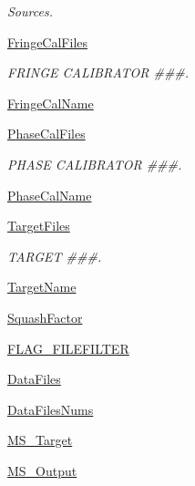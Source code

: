 \begin{DoxyCompactItemize}
\begin{DoxyCompactList}\small\item\em \-Sources. \end{DoxyCompactList}\item 
\hyperlink{class_pipeline_1_1_pipeline_ab6b367f5554299d96da7e775e33ec452}{\-Fringe\-Cal\-Files}
\begin{DoxyCompactList}\small\item\em \-F\-R\-I\-N\-G\-E \-C\-A\-L\-I\-B\-R\-A\-T\-O\-R \#\#\#. \end{DoxyCompactList}\item 
\hyperlink{class_pipeline_1_1_pipeline_a4b0ac4270d57356f5c98400997decec4}{\-Fringe\-Cal\-Name}
\item 
\hyperlink{class_pipeline_1_1_pipeline_a714f0bdb50292682a0feeeebb43f66c7}{\-Phase\-Cal\-Files}
\begin{DoxyCompactList}\small\item\em \-P\-H\-A\-S\-E \-C\-A\-L\-I\-B\-R\-A\-T\-O\-R \#\#\#. \end{DoxyCompactList}\item 
\hyperlink{class_pipeline_1_1_pipeline_abe7d2b03c9499e095c32696eb4407f97}{\-Phase\-Cal\-Name}
\item 
\hyperlink{class_pipeline_1_1_pipeline_a0be4f05b9f36d968de11c252c16d839b}{\-Target\-Files}
\begin{DoxyCompactList}\small\item\em \-T\-A\-R\-G\-E\-T \#\#\#. \end{DoxyCompactList}\item 
\hyperlink{class_pipeline_1_1_pipeline_aebe89f9162b27a3104487970a3b4c0bd}{\-Target\-Name}
\item 
\hyperlink{class_pipeline_1_1_pipeline_ad7d97095bae6dca3e3daf6156440730c}{\-Squash\-Factor}
\item 
\hyperlink{class_pipeline_1_1_pipeline_a82f8f808913b652b74bc1941a6ee53ea}{\-F\-L\-A\-G\-\_\-\-F\-I\-L\-E\-F\-I\-L\-T\-E\-R}
\item 
\hyperlink{class_pipeline_1_1_pipeline_a3f04d205a49e727e667be84e43265778}{\-Data\-Files}
\item 
\hyperlink{class_pipeline_1_1_pipeline_acb1cc59585e560eb6608968c65fae186}{\-Data\-Files\-Nums}
\item 
\hyperlink{class_pipeline_1_1_pipeline_a5cbf746644595e3f820dcd12e5ff11ab}{\-M\-S\-\_\-\-Target}
\item 
\hyperlink{class_pipeline_1_1_pipeline_a01f4c2e7e44d980bb7650a1a31c197d5}{\-M\-S\-\_\-\-Output}
\item 

\end{DoxyCompactItemize}
